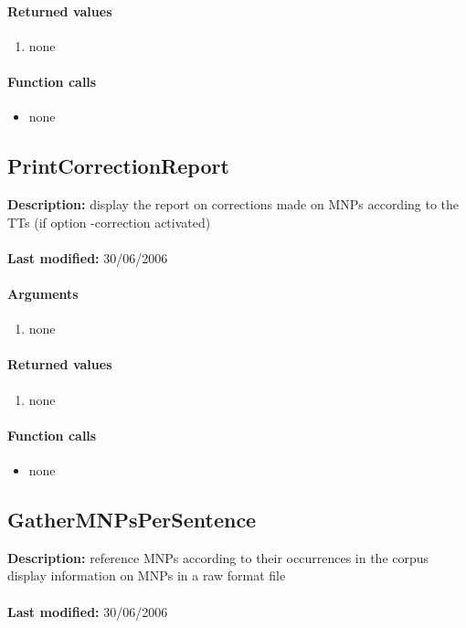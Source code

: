 \paragraph{Returned values}
\begin{enumerate}
\item none
\end{enumerate}

\paragraph{Function calls}
\begin{itemize}
\item none
\end{itemize}

\subsection{PrintCorrectionReport}
\textbf{Description:} display the report on corrections made on MNPs according to the TTs (if option -correction activated)\\
\\\textbf{Last modified:} 30/06/2006

\paragraph{Arguments}
\begin{enumerate}
\item none
\end{enumerate}

\paragraph{Returned values}
\begin{enumerate}
\item none
\end{enumerate}

\paragraph{Function calls}
\begin{itemize}
\item none
\end{itemize}

\subsection{GatherMNPsPerSentence}
\textbf{Description:} reference MNPs according to their occurrences in the corpus\\
display information on MNPs in a raw format file\\
\\\textbf{Last modified:} 30/06/2006

